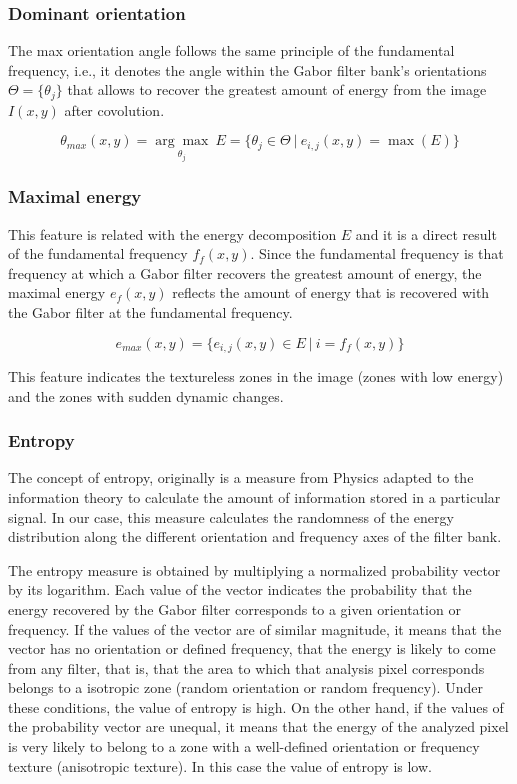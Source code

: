 \subsubsection{Dominant orientation}
The max orientation angle follows the same principle of the fundamental frequency, i.e., it denotes the angle within the Gabor filter bank's orientations $\Theta=\lbrace \theta_j \rbrace$ that allows to recover the greatest amount of energy from the image $I(x, y)$ after covolution.

\begin{equation}
	\theta_{max}(x,y) = \underset{\theta_{j}}{\arg\max} ~ E = \lbrace \theta_{j} \in \Theta ~|~ e_{i,j}(x, y) = \max(E)\rbrace 
\end{equation}

\subsubsection{Maximal energy}
This feature is related with the energy decomposition $E$ and it is a direct result of the fundamental frequency $f_f(x,y)$. Since the fundamental frequency is that frequency at which a Gabor filter recovers the greatest amount of energy, the maximal energy $e_{f}(x,y)$ reflects the amount of energy that is recovered with the Gabor filter at the fundamental frequency.

\begin{equation}
	e_{max}(x,y) = \lbrace e_{i,j}(x,y) \in E ~|~ i = f_{f}(x,y) \rbrace \label{eq:max_energy}
\end{equation}

This feature indicates the textureless zones in the image (zones with low energy) and the zones with sudden dynamic changes.
\subsubsection{Entropy}
The concept of entropy, originally is a measure from Physics adapted to the information theory to calculate the amount of information stored in a particular signal. In our case, this measure calculates the randomness of the energy distribution along the different orientation and frequency axes of the filter bank.

The entropy measure is obtained by multiplying a normalized probability vector by its logarithm. Each value of the vector indicates the probability that the energy recovered by the Gabor filter corresponds to a given orientation or frequency. If the values of the vector are of similar magnitude, it means that the vector has no orientation or defined frequency, that the energy is likely to come from any filter, that is, that the area to which that analysis pixel corresponds belongs to a isotropic zone (random orientation or random frequency). Under these conditions, the value of entropy is high. On the other hand, if the values of the probability vector are unequal, it means that the energy of the analyzed pixel is very likely to belong to a zone with a well-defined orientation or frequency texture (anisotropic texture). In this case the value of entropy is low.

